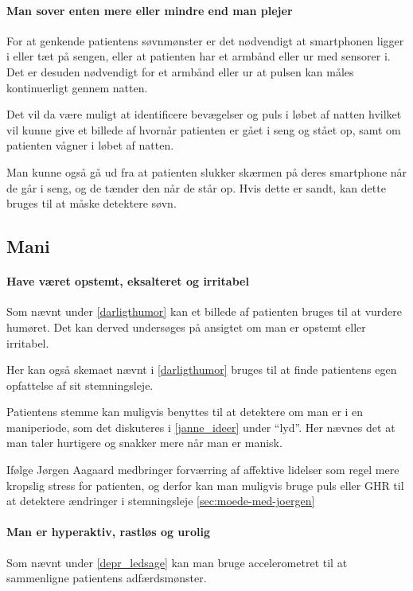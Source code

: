 \paragraph{Man sover enten mere eller mindre end man plejer}
For at genkende patientens søvnmønster er det nødvendigt at smartphonen ligger i eller tæt på sengen, eller at patienten har et armbånd eller ur med sensorer i.
Det er desuden nødvendigt for et armbånd eller ur at pulsen kan måles kontinuerligt gennem natten.

Det vil da være muligt at identificere bevægelser og puls i løbet af natten hvilket vil kunne give et billede af hvornår patienten er gået i seng og stået op, samt om patienten vågner i løbet af natten.

Man kunne også gå ud fra at patienten slukker skærmen på deres smartphone når de går i seng, og de tænder den når de står op. Hvis dette er sandt, kan dette bruges til at måske detektere søvn.

\subsection{Mani}

\paragraph{Have været opstemt, eksalteret og irritabel}
Som nævnt under \cref{darligthumor} kan et billede af patienten bruges til at vurdere humøret. 
Det kan derved undersøges på ansigtet om man er opstemt eller irritabel.

Her kan også skemaet nævnt i \cref{darligthumor} bruges til at finde patientens egen opfattelse af sit stemningsleje.

Patientens stemme kan muligvis benyttes til at detektere om man er i en maniperiode, som det diskuteres i \cref{janne_ideer} under ``lyd''. 
Her nævnes det at man taler hurtigere og snakker mere når man er manisk.

Ifølge Jørgen Aagaard medbringer forværring af affektive lidelser som regel mere kropslig stress for patienten, og derfor kan man muligvis bruge puls eller GHR til at detektere ændringer i stemningsleje \cref{sec:moede-med-joergen}

\paragraph{Man er hyperaktiv, rastløs og urolig}
Som nævnt under \cref{depr_ledsage} kan man bruge accelerometret til at sammenligne patientens adfærdsmønster.

